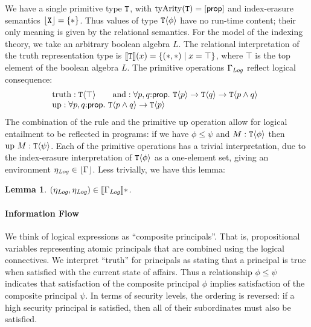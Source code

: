 \documentclass{sigplanconf}
\newcommand{\sepbar}{\mathrel|}
\newcommand{\tyPrim}[2]{\textup{\texttt{#1}}\langle #2 \rangle}
\newcommand{\tyPrimNm}[1]{\textup{\texttt{#1}}}
\newcommand{\primTyArity}{\mathrm{tyArity}}
\newcommand{\ctxtSem}[1]{\left\lfloor #1 \right\rfloor}
\newcommand{\tyPrimSem}[1]{\left\lfloor #1 \right\rfloor}
\newcommand{\rsem}[1]{\llbracket #1 \rrbracket}
\newtheorem{lemma}{Lemma}
\theoremstyle{examplestyle}
\theoremstyle{restatementstyle}
\begin{document}
We have a single primitive type $\tyPrimNm{T}$, with
$\primTyArity(\tyPrimNm{T}) = [\mathsf{prop}]$ and index-erasure
semantics $\tyPrimSem{\tyPrimNm{X}} = \{ * \}$. Thus values of type
$\tyPrim{T}{\phi}$ have no run-time content; their only meaning is
given by the relational semantics. For the model of the indexing
theory, we take an arbitrary boolean algebra $L$. The relational
interpretation of the truth representation type is
$\rsem{\tyPrimNm{T}}(x) = \{ (*,*) \sepbar x = \top \}$, where $\top$
is the top element of the boolean algebra $L$. The primitive
operations $\Gamma_{\mathit{Log}}$ reflect logical consequence:
\begin{displaymath}
  \begin{array}{l}
  \begin{array}{@{}c@{\hspace{2em}}c}
    \mathrm{truth} : \tyPrim{T}{\top} &
    \mathrm{and}   : \forall p, q\mathord:\mathsf{prop}.\ \tyPrim{T}{p} \to \tyPrim{T}{q} \to \tyPrim{T}{p \land q}
  \end{array} \\
  \mathrm{up} : \forall p, q\mathord:\mathsf{prop}.\ \tyPrim{T}{p \land q} \to \tyPrim{T}{p}
\end{array}
\end{displaymath}
The combination of the  rule and the primitive
$\mathrm{up}$ operation allow for logical entailment to be reflected
in programs: if we have $\phi \leq \psi$ and $M : \tyPrim{T}{\phi}$
then $\mathrm{up}\ M : \tyPrim{T}{\psi}$. Each of the primitive
operations has a trivial interpretation, due to the index-erasure
interpretation of $\tyPrim{T}{\phi}$ as a one-element set, giving an
environment $\eta_\infoflow \in \ctxtSem{\Gamma}$. Less trivially, we
have this lemma:
\begin{lemma}\label{lem:environments-information-flow}
  $(\eta_\infoflow, \eta_\infoflow) \in \rsem{\Gamma_\infoflow}{}*$.
\end{lemma}

\paragraph{Information Flow} We think of logical expressions as
``composite principals''. That is, propositional variables representing
atomic principals that are combined using the logical connectives. We
interpret ``truth'' for principals as stating that a principal is true
when satisfied with the current state of affairs. Thus a relationship
$\phi \leq \psi$ indicates that satisfaction of the composite
principal $\phi$ implies satisfaction of the composite principal
$\psi$. In terms of security levels, the ordering is reversed: if a
high security principal is satisfied, then all of their subordinates
must also be satisfied.
\end{document}
